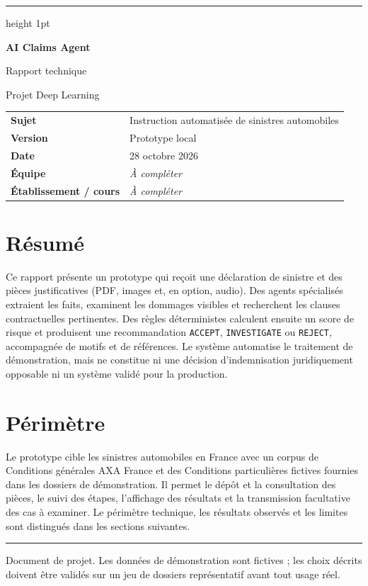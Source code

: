 \documentclass[10pt,a4paper]{article}
\newcommand{\code}[1]{\texttt{\small #1}}
\newcommand{\strong}[1]{\textbf{#1}}
\begin{document}
\begin{titlepage}
\thispagestyle{empty}
\vspace*{1.2cm}
\hrule height 1pt
\vspace{16pt}
{\Huge\bfseries AI Claims Agent\par}
\vspace{7pt}
{\Large Rapport technique\par}
\vspace{10pt}
{\normalsize Projet Deep Learning\par}
\vspace{1.2cm}
\begin{tabular}{@{}ll@{}}
\strong{Sujet} & Instruction automatisée de sinistres automobiles\\
\strong{Version} & Prototype local\\
\strong{Date} & 28 octobre 2026\\
\strong{Équipe} & \emph{À compléter}\\
\strong{Établissement / cours} & \emph{À compléter}\\
\end{tabular}
\vspace{1.2cm}

\section*{Résumé}
Ce rapport présente un prototype qui reçoit une déclaration de sinistre et des pièces justificatives (PDF, images et, en option, audio). Des agents spécialisés extraient les faits, examinent les dommages visibles et recherchent les clauses contractuelles pertinentes. Des règles déterministes calculent ensuite un score de risque et produisent une recommandation \code{ACCEPT}, \code{INVESTIGATE} ou \code{REJECT}, accompagnée de motifs et de références. Le système automatise le traitement de démonstration, mais ne constitue ni une décision d’indemnisation juridiquement opposable ni un système validé pour la production.

\section*{Périmètre}
Le prototype cible les sinistres automobiles en France avec un corpus de Conditions générales AXA France et des Conditions particulières fictives fournies dans les dossiers de démonstration. Il permet le dépôt et la consultation des pièces, le suivi des étapes, l’affichage des résultats et la transmission facultative des cas à examiner. Le périmètre technique, les résultats observés et les limites sont distingués dans les sections suivantes.

\vfill
\hrule
\vspace{6pt}
{\small Document de projet. Les données de démonstration sont fictives ; les choix décrits doivent être validés sur un jeu de dossiers représentatif avant tout usage réel.}
\end{titlepage}
\end{document}
